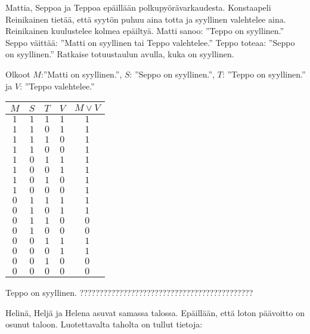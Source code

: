 \begin{tehtavasivu}
\begin{tehtava}
\end{tehtava}

\begin{tehtava}
     Mattia, Seppoa ja Teppoa epäillään polkupyörävarkaudesta. Konstaapeli Reinikainen tietää, että syytön puhuu aina totta ja syyllinen valehtelee aina. Reinikainen kuulustelee kolmea epäiltyä. Matti sanoo: ''Teppo on syyllinen.'' Seppo väittää: ''Matti on syyllinen tai Teppo valehtelee.'' Teppo toteaa: ''Seppo on syyllinen.'' Ratkaise totuustaulun avulla, kuka on syyllinen. 
    \begin{vastaus}
      Olkoot $M$:''Matti on syyllinen.'', $S$: ''Seppo on syyllinen.'', $T$: ''Teppo on syyllinen.'' ja $V$: ''Teppo valehtelee.''
      \begin{center}
		    \begin{tabular}{|c|c|c|c|c|}\hline
		    $M$ & $S$ & $T$ & $V$ & $M\lor V$ \\ \hline
		    $1$ & $1$ & $1$ & $1$ & $1$ \\ %
		    $1$ & $1$ & $0$ & $1$ & $1$ \\
		    $1$ & $1$ & $1$ & $0$ & $1$ \\
		    $1$ & $1$ & $0$ & $0$ & $1$ \\
		    $1$ & $0$ & $1$ & $1$ & $1$ \\
		    $1$ & $0$ & $0$ & $1$ & $1$ \\
		    $1$ & $0$ & $1$ & $0$ & $1$ \\
		    $1$ & $0$ & $0$ & $0$ & $1$ \\
		    $0$ & $1$ & $1$ & $1$ & $1$ \\
		    $0$ & $1$ & $0$ & $1$ & $1$ \\
		    $0$ & $1$ & $1$ & $0$ & $0$ \\
		    $0$ & $1$ & $0$ & $0$ & $0$ \\
		    $0$ & $0$ & $1$ & $1$ & $1$ \\
		    $0$ & $0$ & $0$ & $1$ & $1$ \\
		    $0$ & $0$ & $1$ & $0$ & $0$ \\
		    $0$ & $0$ & $0$ & $0$ & $0$ \\ \hline
\end{tabular}
\end{center}
Teppo on syyllinen. ???????????????????????????????????????????? %
    \end{vastaus}
    
\end{tehtava}

\begin{tehtava}
     Helinä, Heljä ja Helena asuvat samassa talossa. Epäillään, että loton päävoitto on osunut taloon. Luotettavalta taholta on tullut tietoja:


\end{tehtava}
\end{tehtavasivu}
